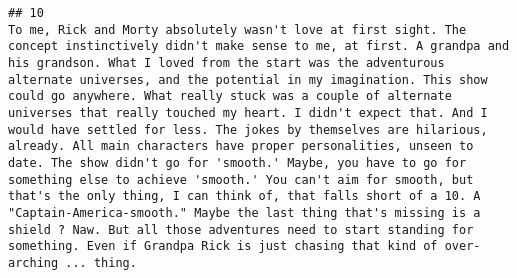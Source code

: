 \documentclass[
]{article}
\begin{document}
\begin{verbatim}
## 10                                                                                                                                                                                                                                                                                                                                                                                                                                                                                                                                                                                                                                                                                                                                                                                                                                                                                                                                                                                                                                                                                                                                                                                                                                                                                                                                                                                                                                                                  To me, Rick and Morty absolutely wasn't love at first sight. The concept instinctively didn't make sense to me, at first. A grandpa and his grandson. What I loved from the start was the adventurous alternate universes, and the potential in my imagination. This show could go anywhere. What really stuck was a couple of alternate universes that really touched my heart. I didn't expect that. And I would have settled for less. The jokes by themselves are hilarious, already. All main characters have proper personalities, unseen to date. The show didn't go for 'smooth.' Maybe, you have to go for something else to achieve 'smooth.' You can't aim for smooth, but that's the only thing, I can think of, that falls short of a 10. A "Captain-America-smooth." Maybe the last thing that's missing is a shield ? Naw. But all those adventures need to start standing for something. Even if Grandpa Rick is just chasing that kind of over-arching ... thing.

\end{verbatim}
\end{document}
